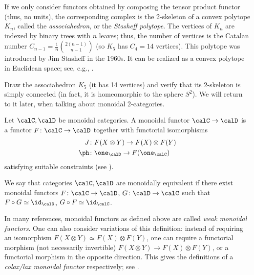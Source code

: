 \begin{remark}\label{r:stasheff}
  If we only consider functors obtained by composing the tensor product functor
  (thus, no units), the corresponding complex is the 2-skeleton of a convex
  polytope $K_n$, called the \emph{associahedron}, or the
  \emph{Stasheff
  polytope}. The vertices of $K_n$ are indexed by
  binary trees with $n$ leaves; thus, the number of vertices is the Catalan
  number $C_{n-1} = \frac{1}{n}\binom{2(n-1)}{n-1}$ (so $K_5$ has
  $C_4 = 14$ vertices).
  This polytope was introduced by Jim Stasheff in the 1960s. It can be realized
  as a convex polytope in Euclidean space; see, e.g.,
  \cite{loday}.
\end{remark}

\begin{exercise}\label{ec:K5}
  Draw the associahedron $K_5$ (it has 14 vertices) and verify that its
  2-skeleton is simply connected (in fact, it is homeomorphic to the sphere
  $S^2$). We will return to it later, when talking about monoidal 2-categories.
\end{exercise}

\begin{definition}\label{d:monoidal_functor}
  Let $\calC, \calD$ be monoidal categories. A monoidal functor
  $\calC\to \calD$ is a functor $F\colon\calC\to\calD$ together
  with functorial isomorphisms
  \begin{align*}
    J&\colon F(X\otimes Y)\to F(X)\otimes F(Y)\\
    \ph&\colon \one_\calD\to F(\one_\calC)
  \end{align*}
  satisfying suitable constraints (see \cite[Section 2.4]{etingof-fusion}).

  We say that categories $\calC, \calD$ are monoidally equivalent
  if there exist monoidal functors $F\colon \calC\to \calD$, $G\colon \calD\to
  \calC$ such that $F\circ G\simeq \id_\calD$, $G\circ F \simeq \id_\calC$.
\end{definition}

\begin{remark}\label{r:lax}
  In many references, monoidal functors as defined above are called \emph{weak
  monoidal functors}. One can also consider variations of this definition:
  instead of requiring an isomorphism $F(X\otimes Y)\simeq F(X)\otimes F(Y)$,
  one can require a functorial morphism (not necessarily invertible)
  $F(X\otimes Y)\to F(X)\otimes F(Y)$, or a functorial morphism in the opposite
  direction.  This gives the definitions of a \emph{colax/lax monoidal functor}
  respectively; see \cite[Definition 1.2.10]{leinster}.
\end{remark}


